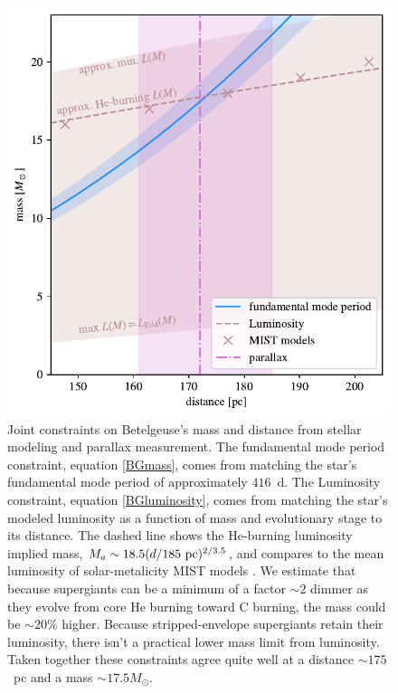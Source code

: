 \documentclass[twocolumn]{aastex631}
\begin{document}
\begin{figure}
    \centering
    \includegraphics[width=\linewidth]{figures/mass-distance.pdf}
    \caption{Joint constraints on Betelgeuse's mass and distance from stellar modeling and parallax measurement. The fundamental mode period constraint, equation \eqref{BGmass}, comes from matching the star's fundamental mode period of approximately $416$~d. The Luminosity constraint, equation \eqref{BGluminosity}, comes from matching the star's modeled luminosity as a function of mass and evolutionary stage to its distance. The dashed line shows the He-burning luminosity implied mass, $M_a \sim 18.5 (d/185~{\rm pc})^{2/3.5}$, and compares to the mean luminosity of solar-metalicity MIST models \citep{2016ApJ...823..102C}. We estimate that because supergiants can be a minimum of a factor $\sim 2$ dimmer as they evolve from core He burning toward C burning, the mass could be $\sim 20$\% higher. Because stripped-envelope supergiants retain their luminosity, there isn't a practical lower mass limit from luminosity. Taken together these constraints agree quite well at a distance $\sim 175$~pc and a mass $\sim 17.5M_\odot$.    }
    \label{fig:mass_distance}
\end{figure}
\end{document}
